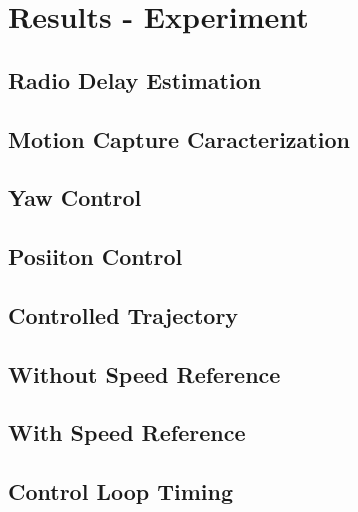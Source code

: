 \documentclass[a4paper, 12pt]{report}
\begin{document}
\section{Results - Experiment}

\subsection{Radio Delay Estimation}
\subsection{Motion Capture Caracterization}
\subsection{Yaw Control}
\subsection{Posiiton Control}
\subsection{Controlled Trajectory}
\subsection{Without Speed Reference}
\subsection{With Speed Reference}
\subsection{Control Loop Timing}
\end{document}
